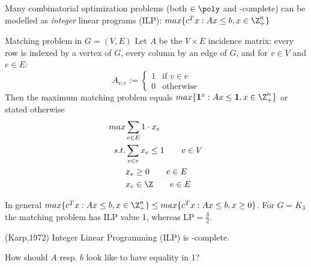 Many combinatorial optimization problems (both $\in \poly$ and \npoly-complete) can be modelled as \emph{integer} linear programs (ILP): $max\{c^T x:Ax \leq b, x \in \Z_+^n\}$

\begin{xmp+}Matching problem in $G=(V,E)$
Let $A$ be the $V\times E$ incidence matrix: every row is indexed by a vertex of $G$, every column by an edge of $G$, and for $v \in V$ and $ e \in E$:\\
\[A_{v,e}:=\begin{cases} 1 & \text{if } v \in e \\
					0 & \text{otherwise}
		\end{cases}
\]
Then the maximum matching problem equals $max\{\mathbf{1}^x: Ax \leq \mathbf{1}, x\in \Z_+^n\}$ or stated otherwise
\begin{align*} 
	max & \sum\limits_{e \in E} 1\cdot x_e \\
	s.t. &\sum\limits_{v \in e} x_e \leq 1 \qquad v \in V \\
	&x_e \geq 0 \qquad e \in E \\
	&x_e \in \Z \qquad e  \in E
\end{align*}

In general $max\{c^Tx:Ax \leq b, x \in \Z_+^n\} \leq max \{c^Tx: Ax \leq b, x\geq 0\}$. For $G=K_3$ the matching problem has ILP value 1, whereas LP$=\frac32$.
\end{xmp+}
\begin{thm}(Karp,1972)
Integer Linear Programming (ILP) is \npoly-complete.
\end{thm}

\begin{qstn}
How should $A$ resp. $b$ look like to have equality in 1?
\end{qstn}